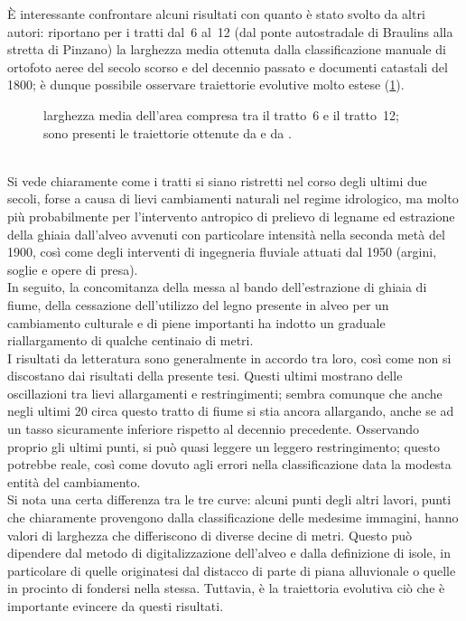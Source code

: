 È interessante confrontare alcuni risultati con quanto è stato svolto da altri autori:  riportano per i tratti dal~6 al~12 (dal ponte autostradale di Braulins alla stretta di Pinzano) la larghezza media ottenuta dalla classificazione manuale di ortofoto aeree del secolo scorso e del decennio passato e documenti catastali del 1800; è dunque possibile osservare traiettorie evolutive molto estese (\cref{graph:larghezze-vs-letteratura}).
%
\begin{figure}
	\centering
	
	\caption[larghezza media dell'area compresa tra il tratto~6 e il tratto~12]{larghezza media dell'area compresa tra il tratto~6 e il tratto~12; sono presenti le traiettorie ottenute da  e da .}
	\label{graph:larghezze-vs-letteratura}
\end{figure}
%
\\
Si vede chiaramente come i tratti si siano ristretti nel corso degli ultimi due secoli, forse a causa di lievi cambiamenti naturali nel regime idrologico, ma molto più probabilmente per l'intervento antropico di prelievo di legname ed estrazione della ghiaia dall'alveo avvenuti con particolare intensità nella seconda metà del 1900, così come degli interventi di ingegneria fluviale attuati dal 1950 (argini, soglie e opere di presa).
\\
In seguito, la concomitanza della messa al bando dell'estrazione di ghiaia di fiume, della cessazione dell'utilizzo del legno presente in alveo per un cambiamento culturale e di piene importanti ha indotto un graduale riallargamento di qualche centinaio di metri.
\\
I risultati da letteratura sono generalmente in accordo tra loro, così come non si discostano dai risultati della presente tesi.
Questi ultimi mostrano delle oscillazioni tra lievi allargamenti e restringimenti; sembra comunque che anche negli ultimi \SI{20}{\anni} circa questo tratto di fiume si stia ancora allargando, anche se ad un tasso sicuramente inferiore rispetto al decennio precedente.
Osservando proprio gli ultimi punti, si può quasi leggere un leggero restringimento; questo potrebbe reale, così come dovuto agli errori nella classificazione data la modesta entità del cambiamento.
\\
Si nota una certa differenza tra le tre curve: alcuni punti degli altri lavori, punti che chiaramente provengono dalla classificazione delle medesime immagini, hanno valori di larghezza che differiscono di diverse decine di metri.
Questo può dipendere dal metodo di digitalizzazione dell'alveo e dalla definizione di isole, in particolare di quelle originatesi dal distacco di parte di piana alluvionale o quelle in procinto di fondersi nella stessa.
Tuttavia, è la traiettoria evolutiva ciò che è importante evincere da questi risultati.


